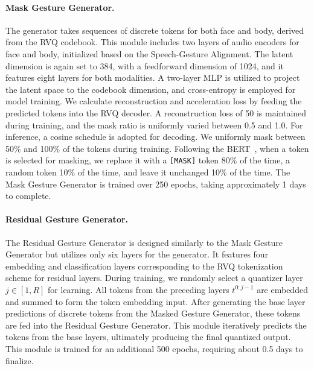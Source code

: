 \paragraph{Mask Gesture Generator.}
The generator takes sequences of discrete tokens for both face and body, derived from the RVQ codebook. This module includes two layers of audio encoders for face and body, initialized based on the Speech-Gesture Alignment. The latent dimension is again set to 384, with a feedforward dimension of 1024, and it features eight layers for both modalities. A two-layer MLP is utilized to project the latent space to the codebook dimension, and cross-entropy is employed for model training. We calculate reconstruction and acceleration loss by feeding the predicted tokens into the RVQ decoder. A reconstruction loss of 50 is maintained during training, and the mask ratio is uniformly varied between 0.5 and 1.0. For inference, a cosine schedule is adopted for decoding. 
We uniformly mask between 50\% and 100\% of the tokens during training. Following the BERT~\cite{devlin2018bert}, when a token is selected for masking, we replace it with a \texttt{[MASK]} token 80\% of the time, a random token 10\% of the time, and leave it unchanged 10\% of the time.  
The Mask Gesture Generator is trained over 250 epochs, taking approximately 1 days to complete.

\paragraph{Residual Gesture Generator.}
The Residual Gesture Generator is designed similarly to the Mask Gesture Generator but utilizes only six layers for the generator. It features four embedding and classification layers corresponding to the RVQ tokenization scheme for residual layers. During training, we randomly select a quantizer layer \( j \in [1, R] \) for learning. All tokens from the preceding layers \( t^{0:j-1} \) are embedded and summed to form the token embedding input. After generating the base layer predictions of discrete tokens from the Masked Gesture Generator, these tokens are fed into the Residual Gesture Generator. This module iteratively predicts the tokens from the base layers, ultimately producing the final quantized output. This module is trained for an additional 500 epochs, requiring about 0.5 days to finalize.




